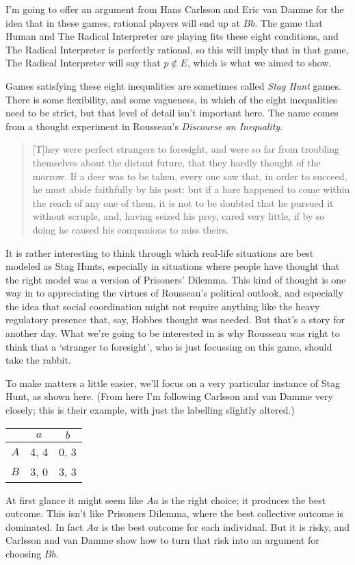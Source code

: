 I'm going to offer an argument from Hans Carlsson and Eric van Damme \citeyearpar{CarlssonVanDamme1993} for the idea that in these games, rational players will end up at $Bb$. The game that Human and The Radical Interpreter are playing fits these eight conditions, and The Radical Interpreter is perfectly rational, so this will imply that in that game, The Radical Interpreter will say that $p \notin E$, which is what we aimed to show.

Games satisfying these eight inequalities are sometimes called \emph{Stag Hunt} games. There is some flexibility, and some vagueness, in which of the eight inequalities need to be strict, but that level of detail isn't important here. The name comes from a thought experiment in Rousseau's \emph{Discourse on Inequality}. 

\begin{quote}

[T]hey were perfect strangers to foresight, and were so far from troubling themselves about the distant future, that they hardly thought of the morrow. If a deer was to be taken, every one saw that, in order to succeed, he must abide faithfully by his post: but if a hare happened to come within the reach of any one of them, it is not to be doubted that he pursued it without scruple, and, having seized his prey, cared very little, if by so doing he caused his companions to miss theirs. ~\citep[209--10]{Rousseau1913}
\end{quote}
It is rather interesting to think through which real-life situations are best modeled as Stag Hunts, especially in situations where people have thought that the right model was a version of Prisoners' Dilemma. This kind of thought is one way in to appreciating the virtues of Rousseau's political outlook, and especially the idea that social coordination might not require anything like the heavy regulatory presence that, say, Hobbes thought was needed. But that's a story for another day. What we're going to be interested in is why Rousseau was right to think that a `stranger to foresight', who is just focussing on this game, should take the rabbit.

To make matters a little easier, we'll focus on a very particular instance of Stag Hunt, as shown here. (From here I'm following Carlsson and van Damme very closely; this is their example, with just the labelling slightly altered.)

\begin{center}
\begin{tabular}{r | c c}
& $a$ & $b$ \\\hline
$A$ & 4, 4 & 0, 3 \\
$B$ & 3, 0 & 3, 3
\end{tabular}
\end{center}
At first glance it might seem like $Aa$ is the right choice; it produces the best outcome. This isn't like Prisoners Dilemma, where the best collective outcome is dominated. In fact $Aa$ is the best outcome for each individual. But it is risky, and Carlsson and van Damme show how to turn that risk into an argument for choosing $Bb$.

